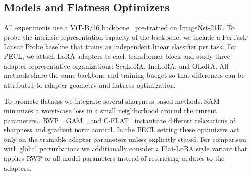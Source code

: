 \documentclass{article}
\theoremstyle{plain}
\theoremstyle{definition}
\theoremstyle{remark}
\begin{document}

\subsection{Models and Flatness Optimizers}

All experiments use a ViT-B/16 backbone~\cite{dosovitskiy2020image} pre-trained on ImageNet-21K. To probe the intrinsic representation capacity of the backbone, we include a PerTask Linear Probe baseline that trains an independent linear classifier per task. For PECL, we attach LoRA adapters to each transformer block and study three adapter  representative organizations: SeqLoRA, IncLoRA, and OLoRA.
All methods share the same backbone and training budget so that differences can be attributed to adapter geometry and flatness optimization.

To promote flatness we integrate several sharpness-based methods. SAM~\cite{foretSharpnessAwareMinimizationEfficiently2021} minimizes a worst-case loss in a small neighborhood around the current parameters.. RWP~\cite{pmlr-v151-bisla22a}, GAM~\cite{zhangGradientNormAware2023}, and C-FLAT~\cite{NEURIPS2024_C-Flat} instantiate different relaxations of sharpness and gradient norm control. In the PECL setting these optimizers act only on the trainable adapter parameters unless explicitly stated. For comparison with global perturbations we additionally consider a Flat-LoRA style variant that applies RWP to all model parameters instead of restricting updates to the adapters.
\end{document}
